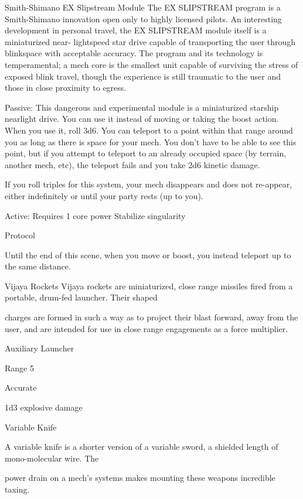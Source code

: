                                      Smith-Shimano EX Slipstream Module  
   The EX SLIPSTREAM program is a Smith-Shimano innovation open only to highly licensed pilots. An  
  interesting development in personal travel, the EX SLIPSTREAM module itself is a miniaturized near- 
  lightspeed star drive capable of transporting the user through blinkspace with acceptable accuracy. The  
  program and its technology is temperamental; a mech core is the smallest unit capable of surviving the  
  stress of exposed blink travel, though the experience is still traumatic to the user and those in close  
  proximity to egress.    

   Passive:  
  This dangerous and experimental module is a miniaturized starship nearlight drive. You can use it  
   instead of moving or taking the boost action. When you use it, roll 3d6. You can teleport to a point  
  within that range around you as long as there is space for your mech. You don’t have to be able to see  
  this point, but if you attempt to teleport to an already occupied space (by terrain, another mech, etc),  
  the teleport fails and you take 2d6 kinetic damage.
 

   If you roll triples for this system, your mech disappears and does not re-appear, either indefinitely or  
   until your party rests (up to you).
 

  Active: Requires 1 core power  
  Stabilize singularity
 
   Protocol
 
   Until the end of this scene, when you move or boost, you instead teleport up to the same distance. 

Vijaya Rockets  
Vijaya rockets are miniaturized, close range missiles fired from a portable, drum-fed launcher. Their shaped  

charges are formed in such a way as to project their blast forward, away from the user, and are intended for  
use in close range engagements as a force multiplier.   

Auxiliary Launcher
 
Range 5
 
Accurate
 
1d3 explosive damage
 

Variable Knife  

A variable knife is a shorter version of a variable sword, a shielded length of mono-molecular wire. The  

power drain on a mech’s systems makes mounting these weapons incredible taxing.  

